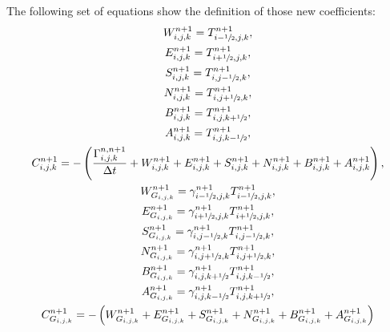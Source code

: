 The following set of equations show the definition of those new coefficients:
	\begin{gather}\label{coef1}
	W_{i,j,k}^{n+1}=T_{i-\sfrac{1}{2},j,k}^{n+1},\\
	E_{i,j,k}^{n+1}=T_{i+\sfrac{1}{2},j,k}^{n+1},\\
	S_{i,j,k}^{n+1}=T_{i,j-\sfrac{1}{2},k}^{n+1},\\
	N_{i,j,k}^{n+1}=T_{i,j+\sfrac{1}{2},k}^{n+1},\\
	B_{i,j,k}^{n+1}=T_{i,j,k+\sfrac{1}{2}}^{n+1},\\
	A_{i,j,k}^{n+1}=T_{i,j,k-\sfrac{1}{2}}^{n+1},\\
	C_{i,j,k}^{n+1}=-\left(\frac{\Gamma_{i,j,k}^{n,n+1}}{\Delta t} + W_{i,j,k}^{n+1}+E_{i,j,k}^{n+1}+S_{i,j,k}^{n+1}+N_{i,j,k}^{n+1}+B_{i,j,k}^{n+1}+A_{i,j,k}^{n+1}\right),\\
	W_{G_{i,j,k}}^{n+1}=\gamma_{i-\sfrac{1}{2},j,k}^{n+1}T_{i-\sfrac{1}{2},j,k}^{n+1},\\
	E_{G_{i,j,k}}^{n+1}=\gamma_{i+\sfrac{1}{2},j,k}^{n+1}T_{i+\sfrac{1}{2},j,k}^{n+1},\\
	S_{G_{i,j,k}}^{n+1}=\gamma_{i,j-\sfrac{1}{2},k}^{n+1}T_{i,j-\sfrac{1}{2},k}^{n+1},\\
	N_{G_{i,j,k}}^{n+1}=\gamma_{i,j+\sfrac{1}{2},k}^{n+1}T_{i,j+\sfrac{1}{2},k}^{n+1},\\
	B_{G_{i,j,k}}^{n+1}=\gamma_{i,j,k+\sfrac{1}{2}}^{n+1}T_{i,j,k-\sfrac{1}{2}}^{n+1},\\
	A_{G_{i,j,k}}^{n+1}=\gamma_{i,j,k-\sfrac{1}{2}}^{n+1}T_{i,j,k+\sfrac{1}{2}}^{n+1},\\
	C_{G_{i,j,k}}^{n+1}=-\left( W_{G_{i,j,k}}^{n+1}+E_{G_{i,j,k}}^{n+1}+S_{G_{i,j,k}}^{n+1}+N_{G_{i,j,k}}^{n+1}+B_{G_{i,j,k}}^{n+1}+A_{G_{i,j,k}}^{n+1}\right)
	\end{gather}
